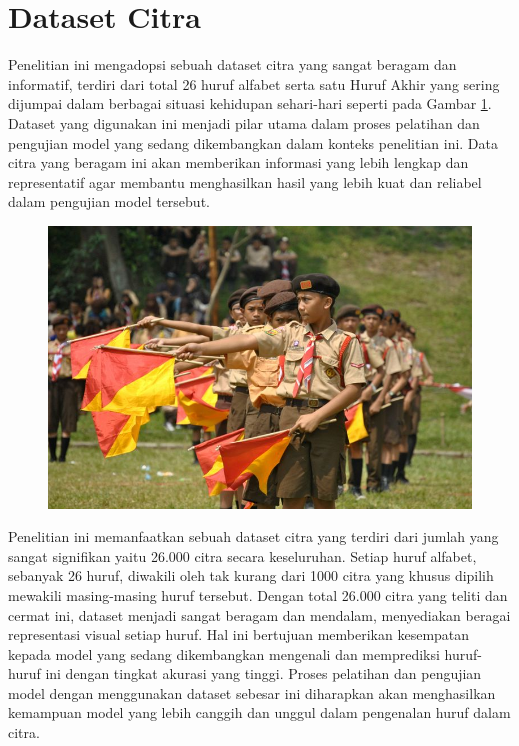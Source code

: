 \section{Dataset Citra}
Penelitian ini mengadopsi sebuah dataset citra yang sangat beragam dan informatif, terdiri dari total 26 huruf alfabet serta satu Huruf Akhir yang sering dijumpai dalam berbagai situasi kehidupan sehari-hari seperti pada Gambar \ref{fig:poseAbjadBISINDO}. Dataset yang digunakan ini menjadi pilar utama dalam proses pelatihan dan pengujian model yang sedang dikembangkan dalam konteks penelitian ini. Data citra yang beragam ini akan memberikan informasi yang lebih lengkap dan representatif agar membantu menghasilkan hasil yang lebih kuat dan reliabel dalam pengujian model tersebut.
\begin{figure}[hbt!]
	\includegraphics[width=0.7\linewidth]{gambar/bener/kerja-semaphore.jpg}
	\label{fig:poseAbjadBISINDO}
\end{figure}
Penelitian ini memanfaatkan sebuah dataset citra yang terdiri dari jumlah yang sangat signifikan yaitu 26.000 citra secara keseluruhan. Setiap huruf alfabet, sebanyak 26 huruf, diwakili oleh tak kurang dari 1000 citra yang khusus dipilih mewakili masing-masing huruf tersebut. Dengan total 26.000 citra yang teliti dan cermat ini, dataset menjadi sangat beragam dan mendalam, menyediakan beragai representasi visual setiap huruf. Hal ini bertujuan memberikan kesempatan kepada model yang sedang dikembangkan mengenali dan memprediksi huruf-huruf ini dengan tingkat akurasi yang tinggi. Proses pelatihan dan pengujian model dengan menggunakan dataset sebesar ini diharapkan akan menghasilkan kemampuan model yang lebih canggih dan unggul dalam pengenalan huruf dalam citra.
